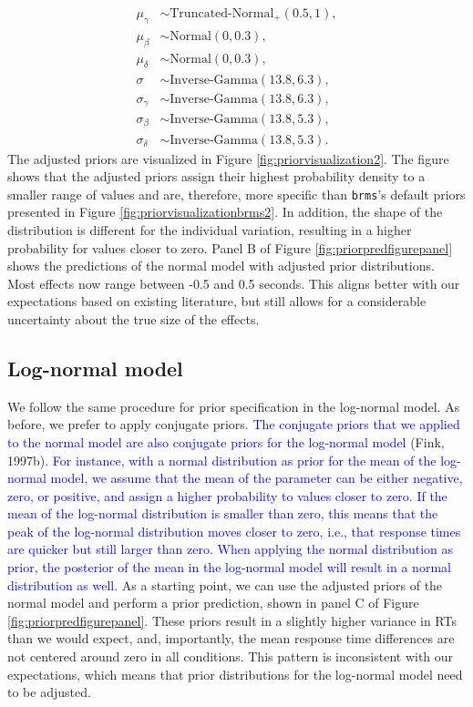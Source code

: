 \documentclass[
  english,
  doc,floatsintext]{apa6}
\begin{document}
\begin{equation}
\begin{aligned}
\mu_{\gamma} &\sim \text{Truncated-Normal}_{+}(0.5, 1), \label{eq:chosenpriors2sd} \\
\mu_{\beta} &\sim \text{Normal}(0, 0.3), \\ 
\mu_{\delta} &\sim \text{Normal}(0, 0.3), \\  
\sigma &\sim \text{Inverse-Gamma}(13.8, 6.3),  \\ 
\sigma_{\gamma} &\sim \text{Inverse-Gamma}(13.8, 6.3), \\   
\sigma_{\beta} &\sim \text{Inverse-Gamma}(13.8, 5.3), \\    
\sigma_{\delta} &\sim \text{Inverse-Gamma}(13.8, 5.3).     
\end{aligned}
\end{equation}
The adjusted priors are visualized in Figure \ref{fig:priorvisualization2}. The figure shows that the adjusted priors assign their highest probability density to a smaller range of values and are, therefore, more specific than \texttt{brms}'s default priors presented in Figure \ref{fig:priorvisualizationbrms2}. In addition, the shape of the distribution is different for the individual variation, resulting in a higher probability for values closer to zero. Panel B of Figure \ref{fig:priorpredfigurepanel} shows the predictions of the normal model with adjusted prior distributions. Most effects now range between -0.5 and 0.5 seconds. This aligns better with our expectations based on existing literature, but still allows for a considerable uncertainty about the true size of the effects.

\hypertarget{log-normal-model-1}{%
\subsection{Log-normal model}\label{log-normal-model-1}}

We follow the same procedure for prior specification in the log-normal model. As before, we prefer to apply conjugate priors. \textcolor{blue}{The conjugate priors that we applied to the normal model are also conjugate priors for the log-normal model} (Fink, 1997b). \textcolor{blue}{For instance, with a normal distribution as prior for the mean of the log-normal model, we assume that the mean of the parameter can be either negative, zero, or positive, and assign a higher probability to values closer to zero. If the mean of the log-normal distribution is smaller than zero, this means that the peak of the log-normal distribution moves closer to zero, i.e., that response times are quicker but still larger than zero. When applying the normal distribution as prior, the posterior of the mean in the log-normal model will result in a normal distribution as well.}
As a starting point, we can use the adjusted priors of the normal model and perform a prior prediction, shown in panel C of Figure \ref{fig:priorpredfigurepanel}. These priors result in a slightly higher variance in RTs than we would expect, and, importantly, the mean response time differences are not centered around zero in all conditions. This pattern is inconsistent with our expectations, which means that prior distributions for the log-normal model need to be adjusted.
\end{document}
